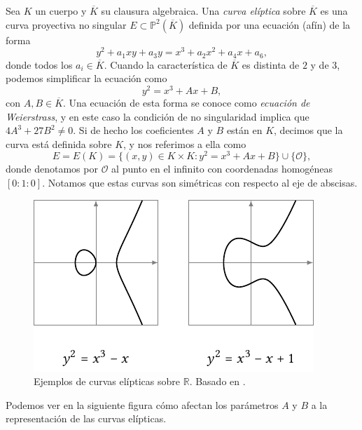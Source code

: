 \documentclass[
  a4paper,
  12pt,
  spanish,
]{scrartcl}
\begin{document}
    Sea $K$ un cuerpo y $\overline{K}$ su clausura algebraica. Una \textit{curva elíptica} sobre $\overline{K}$ es una curva proyectiva no singular $E \subset \mathbb{P}^2(\overline{K})$ definida por una ecuación (afín) de la forma \[ y^2 + a_1xy + a_3y = x^3 +a_2x^2 + a_4x + a_6, \] donde todos los $a_i \in \overline{K}$.
    Cuando la característica de $\overline{K}$ es distinta de $2$ y de $3$, podemos simplificar la ecuación como \[ y^2 = x^3 + Ax + B, \] con $A,B \in \overline{K}$. Una ecuación de esta forma se conoce como \textit{ecuación de Weierstrass}, y en este caso la condición de no singularidad implica que $4A^3 + 27B^2 \neq 0$. Si de hecho los coeficientes $A$ y $B$ están en $K$, decimos que la curva está definida sobre $K$, y nos referimos a ella como \[ E = E(K) = \{ (x, y) \in K \times K : y^2 = x^3 + Ax + B\} \cup \{\mathcal{O}\}, \] donde denotamos por $\mathcal{O}$ al punto en el infinito con coordenadas homogéneas $[0:1:0]$. Notamos que estas curvas son simétricas con respecto al eje de abscisas.
    
\begin{figure}[h]
  \centering
  \includegraphics[width=.75\textwidth]{img/ejemplos-curvas}
  \caption{Ejemplos de curvas elípticas sobre $\mathbb{R}$. Basado en \parencite{eichlseder_elliptic_2016}.}
  \label{fig:curva}
\end{figure}

Podemos ver en la siguiente figura cómo afectan los parámetros $A$ y $B$ a la representación de las curvas elípticas.
\end{document}

